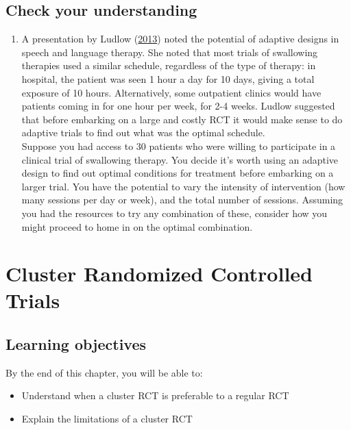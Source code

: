 \documentclass{krantz}
\providecommand{\tightlist}{%
\setlength{\itemsep}{0pt}\setlength{\parskip}{0pt}}
\begin{document}
\hypertarget{check-your-understanding-16}{%
\section{Check your understanding}\label{check-your-understanding-16}}

\begin{enumerate}
\def\labelenumi{\arabic{enumi}.}
\tightlist
\item
  A presentation by Ludlow (\protect\hyperlink{ref-ludlow2013}{2013}) noted the potential of adaptive designs in speech and language therapy. She noted that most trials of swallowing therapies used a similar schedule, regardless of the type of therapy: in hospital, the patient was seen 1 hour a day for 10 days, giving a total exposure of 10 hours. Alternatively, some outpatient clinics would have patients coming in for one hour per week, for 2-4 weeks. Ludlow suggested that before embarking on a large and costly RCT it would make sense to do adaptive trials to find out what was the optimal schedule.\\
  Suppose you had access to 30 patients who were willing to participate in a clinical trial of swallowing therapy. You decide it's worth using an adaptive design to find out optimal conditions for treatment before embarking on a larger trial. You have the potential to vary the intensity of intervention (how many sessions per day or week), and the total number of sessions. Assuming you had the resources to try any combination of these, consider how you might proceed to home in on the optimal combination.
\end{enumerate}

\hypertarget{cluster}{%
\chapter{Cluster Randomized Controlled Trials}\label{cluster}}

\hypertarget{learning-objectives-16}{%
\section{Learning objectives}\label{learning-objectives-16}}

By the end of this chapter, you will be able to:

\begin{itemize}
\item
  Understand when a cluster RCT is preferable to a regular RCT
\item
  Explain the limitations of a cluster RCT
\end{itemize}
\end{document}
